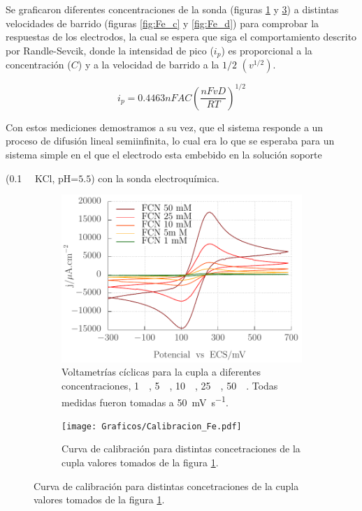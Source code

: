 		  Se graficaron diferentes concentraciones de la sonda (figuras \ref{fig:Fe_a} y  \ref{fig:Fe_b}) a distintas velocidades de barrido (figuras \ref{fig:Fe_c} y  \ref{fig:Fe_d}) para comprobar la respuestas de los electrodos, la cual se espera que siga el comportamiento descrito por Randle-Sevcik, donde  la intensidad de pico ($i_p$) es proporcional a la concentración ($C$) y a la velocidad de barrido a la $1/2$ $(v^{1/2})$.
		  
		 	\begin{equation}
			i_p=0.4463nFAC\left(\frac{nFvD}{RT}\right)^{1/2}
			\end{equation}
		
		  Con estos mediciones demostramos a su vez, que el sistema responde a un proceso de difusión lineal semiinfinita, lo cual era lo que se esperaba para un sistema simple en el que el electrodo esta embebido en la solución soporte {(\SI{0,1}{\milli\Molar} KCl, pH=$5.5$) con la sonda electroquímica.

			\begin{figure}[ht]
	 	    	\begin{subfigure}[t]{0.5\textwidth}
	         	\includegraphics[width=\textwidth]{Graficos/Concentraciones_Fe.pdf}
	        	\caption{Voltametrías cíclicas para la cupla \fe\space a diferentes concentraciones, \SI{1}{\milli\Molar}, \SI{5}{\milli\Molar}, \SI{10}{\milli\Molar}, \SI{25}{\milli\Molar}, \SI{50}{\milli\Molar}. Todas medidas fueron tomadas a \SI{50}{\milli\volt\per\second}.}
	         	\label{fig:Fe_a}
	     		\end{subfigure}
     		 \begin{subfigure}[t]{0.495\textwidth}
	        	\texttt{[image: Graficos/Calibracion\_Fe.pdf]}
	       		\caption{Curva de calibración para distintas concetraciones de la cupla \fe\space valores tomados de la figura \ref{fig:Fe_a}.}
	         	\label{fig:Fe_b}
	     		\end{subfigure}


\end{figure}}
